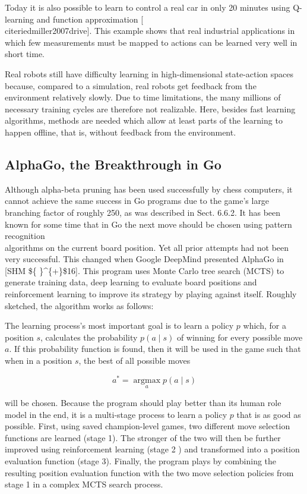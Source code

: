 \documentclass[10pt]{book}
\begin{document}
Today it is also possible to learn to control a real car in only 20 minutes using Q-learning and function approximation [\\cite{riedmiller2007drive}]. This example shows that real industrial applications in which few measurements must be mapped to actions can be learned very well in short time.

Real robots still have difficulty learning in high-dimensional state-action spaces because, compared to a simulation, real robots get feedback from the environment relatively slowly. Due to time limitations, the many millions of necessary training cycles are therefore not realizable. Here, besides fast learning algorithms, methods are needed which allow at least parts of the learning to happen offline, that is, without feedback from the environment.

\subsection*{AlphaGo, the Breakthrough in Go}
Although alpha-beta pruning has been used successfully by chess computers, it cannot achieve the same success in Go programs due to the game's large branching factor of roughly 250, as was described in Sect. 6.6.2. It has been known for some time that in Go the next move should be chosen using pattern recognition\\[0pt]
algorithms on the current board position. Yet all prior attempts had not been very successful. This changed when Google DeepMind presented AlphaGo in [SHM \$\{ \}\^{}\{+\}\$16]. This program uses Monte Carlo tree search (MCTS) to generate training data, deep learning to evaluate board positions and reinforcement learning to improve its strategy by playing against itself. Roughly sketched, the algorithm works as follows:


The learning process's most important goal is to learn a policy $p$ which, for a position $s$, calculates the probability $p(a \mid s)$ of winning for every possible move $a$. If this probability function is found, then it will be used in the game such that when in a position $s$, the best of all possible moves

$$
a^{*}=\underset{a}{\operatorname{argmax}} p(a \mid s)
$$

will be chosen. Because the program should play better than its human role model in the end, it is a multi-stage process to learn a policy $p$ that is as good as possible. First, using saved champion-level games, two different move selection functions are learned (stage 1). The stronger of the two will then be further improved using reinforcement learning (stage 2 ) and transformed into a position evaluation function (stage 3). Finally, the program plays by combining the resulting position evaluation function with the two move selection policies from stage 1 in a complex MCTS search process.
\end{document}
